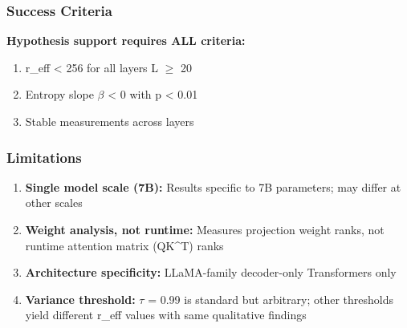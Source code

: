 \subsubsection{Success Criteria}

\textbf{Hypothesis support requires ALL criteria:}
\begin{enumerate}
\item r\_eff < 256 for all layers L $\geq$ 20
\item Entropy slope $\beta$ < 0 with p < 0.01
\item Stable measurements across layers
\end{enumerate}

\subsubsection{Limitations}

\begin{enumerate}
\item \textbf{Single model scale (7B):} Results specific to 7B parameters; may differ at other scales
\item \textbf{Weight analysis, not runtime:} Measures projection weight ranks, not runtime attention matrix (QK^T) ranks
\item \textbf{Architecture specificity:} LLaMA-family decoder-only Transformers only
\item \textbf{Variance threshold:} $\tau$ = 0.99 is standard but arbitrary; other thresholds yield different r\_eff values with same qualitative findings
\end{enumerate}

